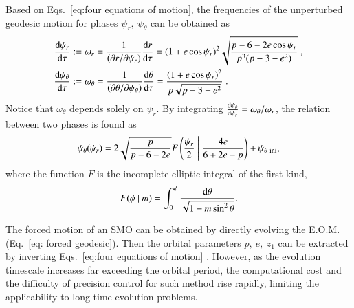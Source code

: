 \documentclass[aps,prx,reprint,superscriptaddress,nofootinbib,longbibliography]{revtex4-1}
\begin{document}
Based on Eqs.~\eqref{eq:four equations of motion}, 
the frequencies of the unperturbed geodesic motion for phases $\psi_{r},\ \psi_{\theta}$ can be obtained as
\begin{equation}
\begin{aligned}
     \dv{\psi_{r}}{\tau}&:=\omega_{r}=\frac{1}{(\partial r/\partial\psi_{r})}\dv{r}{\tau}=(1+e\cos\psi_{r})^{2}\sqrt{\frac{p-6-2e\cos\psi_{r}}{p^{3}(p-3-e^{2})}}\ , \\
    \dv{\psi_{\theta}}{\tau}&:=\omega_{\theta}=\frac{1}{(\partial\theta/\partial\psi_{\theta})}\dv{\theta}{\tau}=\frac{(1+e\cos\psi_{r})^{2}}{p\sqrt{p-3-e^{2}}}\ .
    \label{eq:dpsidtau and dchidtau}
\end{aligned}
\end{equation}
Notice that $\omega_{\theta}$ depends solely on $\psi_{r}$. By integrating $\dv{\psi_{\theta}}{\psi_{r}}=\omega_{\theta}/\omega_{r}$, the relation between two phases is found as
\begin{equation}
    \psi_{\theta}(\psi_{r})=2\sqrt{\frac{p}{p-6-2e}}F\left(\frac{\psi_{r}}{2}\ \Bigg|\ \frac{4e}{6+2e-p}\right)+ \psi_{\theta\ \rm ini},
\end{equation}
where the function $F$ is the incomplete elliptic integral of the first kind,
\begin{equation}
    F(\phi\ |\ m)=\int_{0}^{\phi}\frac{\rm d\theta}{\sqrt{1-m\sin^2\theta}}.
\end{equation}

The forced motion of an SMO can be obtained by directly  evolving the E.O.M. (Eq.~\eqref{eq: forced geodesic}). Then the orbital parameters $p,\ e,\ z_{1}$ can be extracted by inverting Eqs.~\eqref{eq:four equations of motion} \cite{Fujita_2009}. However, as the evolution timescale increases far exceeding the orbital period, the computational cost and the difficulty of precision control for such method rise rapidly, limiting the applicability to long-time evolution problems.
\end{document}
